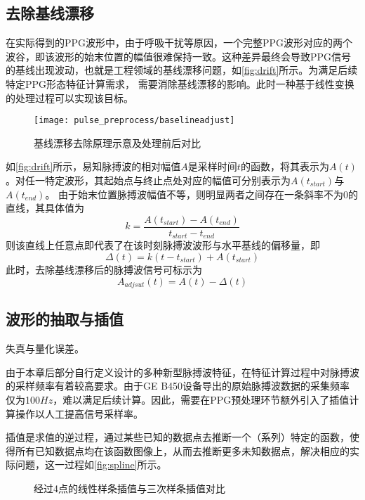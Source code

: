 \subsection{去除基线漂移}
在实际得到的PPG波形中，由于呼吸干扰等原因，一个完整PPG波形对应的两个波谷，即该波形的始末位置的幅值很难保持一致。这种差异最终会导致PPG信号的基线出现波动，也就是工程领域的基线漂移问题，如\autoref{fig:drift}所示。为满足后续特定PPG形态特征计算需求，
需要消除基线漂移的影响。此时一种基于线性变换的处理过程可以实现该目标。
\begin{figure}[htbp]
    \centering
    \texttt{[image: pulse\_preprocess/baselineadjust]}
    \caption{\label{fig:drift}基线漂移去除原理示意及处理前后对比}
\end{figure}

如\autoref{fig:drift}所示，易知脉搏波的相对幅值$A$是采样时间$t$的函数，将其表示为$A(t)$。对任一特定波形，其起始点与终止点处对应的幅值可分别表示为$A(t_{start})$与$A(t_{end})$。
由于始末位置脉搏波幅值不等，则明显两者之间存在一条斜率不为0的直线，其具体值为
\begin{equation}
    \label{equ:linek}
    k=\frac{A(t_{start})-A(t_{end})}{t_{start}-t_{end}}
\end{equation}
则该直线上任意点即代表了在该时刻脉搏波波形与水平基线的偏移量，即
\begin{equation}
    \label{equ:liney}
    \Delta(t)=k(t-t_{start})+A(t_{start})
\end{equation}
此时，去除基线漂移后的脉搏波信号可标示为
\begin{equation}
    \label{equ:adjusta}
    A_{adjsut}(t)=A(t)-\Delta(t)
\end{equation}

\subsection{波形的抽取与插值}
失真与量化误差。

由于本章后部分自行定义设计的多种新型脉搏波特征，在特征计算过程中对脉搏波的采样频率有着较高要求。由于GE B450设备导出的原始脉搏波数据的采集频率仅为100$Hz$，难以满足后续计算。因此，需要在PPG预处理环节额外引入了插值计算操作以人工提高信号采样率。

插值是求值的逆过程，通过某些已知的数据点去推断一个（系列）特定的函数，使得所有已知数据点均在该函数图像上，从而去推断更多未知数据点，解决相应的实际问题，这一过程如\autoref{fig:spline}所示。
\begin{figure}[htbp]
    \centering
    \quad
    \caption{\label{fig:spline}经过4点的线性样条插值与三次样条插值对比}
\end{figure}

